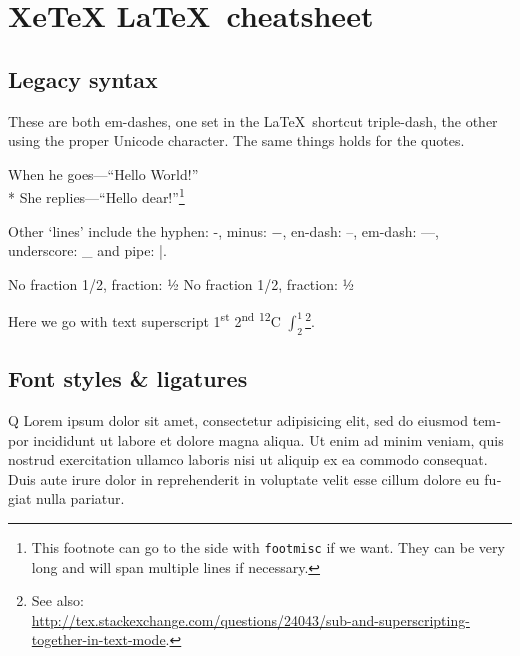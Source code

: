 \documentclass[draft=false]{book}
\newcommand{\tsup}[1]{\textsuperscript{#1}}
\newcommand{\tsub}[1]{\textsubscript{#1}}
\newcommand{\squash}[1]{\makebox[0pt]{#1}}
\begin{document}
\thispagestyle{empty}
\tableofcontents

\sectionfont{\sectionrule{3ex}{3pt}{-1ex}{1pt}}

\chapter{XeTeX \LaTeX\ cheatsheet}

\section{Legacy syntax}
These are both em-dashes, one set in the \LaTeX\ shortcut triple-dash, the other using the proper Unicode character. The same things holds for the quotes.

When he goes---``Hello World!''\\*
She replies—“Hello dear!”\footnote{This footnote can go to the side with \texttt{footmisc} if we want. They can be very long and will span multiple lines if necessary.}

Other `lines' include the hyphen: -, minus: $-$, en-dash: --, em-dash: ---, underscore: \_ and pipe: |.

No fraction 1/2, fraction: 1⁄2 
{\sffamily No fraction 1/2, fraction: 1⁄2} 

Here we go with text superscript 1\tsup{st} 2\tsup{nd} \squash{\tsub{6}}\tsup{12}C $\int^{1}_{2}$\footnote{See also:\\ \url{http://tex.stackexchange.com/questions/24043/sub-and-superscripting-together-in-text-mode}.}.

\section{Font styles \& ligatures}

{
\begin{latin}
\fontsize{18pt}{18pt}\selectfont Q
\fontsize{12pt}{18pt}\selectfont {\scshape uesto è strano assai!} Lorem ipsum dolor sit amet, consectetur adipisicing elit, sed do eiusmod tempor incididunt ut labore et dolore magna aliqua. Ut enim ad minim veniam, quis nostrud exercitation ullamco laboris nisi ut aliquip ex ea commodo consequat. Duis aute irure dolor in reprehenderit in voluptate velit esse cillum dolore eu fugiat nulla pariatur. 
\end{latin}
}
\end{document}
